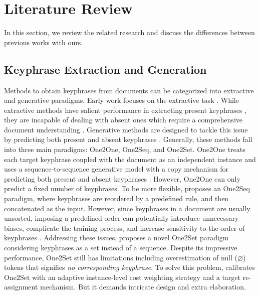 \section{Literature Review}
\label{s:review}
In this section, we review the related research and discuss the differences between previous works with ours.
\subsection{Keyphrase Extraction and Generation} 
Methods to obtain keyphrases from documents  can be categorized into extractive and generative paradigms.
Early work focuses on the extractive task \cite{kpe2020,kpeplm}. While extractive methods have salient performance in extracting present keyphrases \cite{kpe2020,kpeplm}, they are incapable of dealing with absent ones which require a comprehensive document understanding \cite{unikeyphrase, promptkp}. Generative methods are designed to tackle this issue by predicting both present and absent keyphrases \cite{kp20k, one2seq, kpgplm}. Generally, these methods fall into three main paradigms: One2One, One2Seq, and One2Set. 
One2One treats each target keyphrase coupled with the document as an independent instance and uses a sequence-to-sequence generative model with a copy mechanism for predicting both present and absent keyphrases \cite{kp20k}. However, One2One can only predict a fixed number of keyphrases. To be more flexible, \cite{one2seq} proposes an One2Seq paradigm, where keyphrases are reordered by a predefined rule, and then concatenated as the input. However, since keyphrases in a document are usually unsorted, imposing a predefined order can potentially introduce unnecessary biases, complicate the training process, and increase sensitivity to the order of keyphrases \cite{one2set, wrone2set}. Addressing these issues, \cite{one2set} proposes a novel One2Set paradigm considering keyphrases as a set instead of a sequence. 
Despite its impressive performance, One2Set still has limitations including overestimation of null ($\varnothing$) tokens that signifies \textit{no corresponding keyphrase}. To solve this problem, \cite{wrone2set} calibrates One2Set with an adaptive instance-level cost weighting strategy and a target re-assignment mechanism. But it demands intricate design and extra elaboration. 

